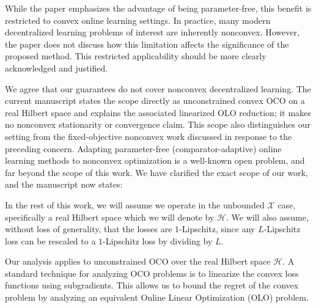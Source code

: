 \documentclass[12pt,english]{reviewresponse}
\newcommand{\Hil}{\mathcal{H}}
\begin{document}
\begin{revcomment}
    While the paper emphasizes the advantage of being parameter-free, this benefit is restricted to convex online learning settings. In practice, many modern decentralized learning problems of interest are inherently nonconvex. However, the paper does not discuss how this limitation affects the significance of the proposed method. This restricted applicability should be more clearly acknowledged and justified.
\end{revcomment}
\begin{revresponse}
    We agree that our guarantees do not cover nonconvex decentralized learning.  The current manuscript states the scope directly as unconstrained convex OCO on a real Hilbert space and explains the associated linearized OLO reduction; it makes no nonconvex stationarity or convergence claim.  This scope also distinguishes our setting from the fixed-objective nonconvex work discussed in response to the preceding concern.
    Adapting parameter-free (comparator-adaptive) online learning methods to nonconvex optimization is a well-known open problem, and far beyond the scope of this work.
    We have clarified the exact scope of our work, and the manuscript now states:
    \begin{changes}
        In the rest of this work, we will assume we operate in the unbounded $\mathcal{X}$ case, specifically a real Hilbert space which we will denote by $\Hil$.
        We will also assume, without loss of generality, that the losses are $1$-Lipschitz, since any $L$-Lipschitz loss can be rescaled to a $1$-Lipschitz loss by dividing by $L$.

        Our analysis applies to unconstrained OCO over the real Hilbert space $\Hil$.
        A standard technique for analyzing OCO problems is to linearize the convex loss functions using subgradients.
        This allows us to bound the regret of the convex problem by analyzing an equivalent Online Linear Optimization (OLO) problem.
    \end{changes}
\end{revresponse}
\end{document}
